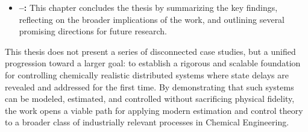 \begin{itemize}
    \item \textbf{--:} This chapter concludes the thesis by summarizing the key findings, reflecting on the broader implications of the work, and outlining several promising directions for future research.
\end{itemize}


This thesis does not present a series of disconnected case studies, but a unified progression toward a larger goal: to establish a rigorous and scalable foundation for controlling chemically realistic distributed systems where state delays are revealed and addressed for the first time. By demonstrating that such systems can be modeled, estimated, and controlled without sacrificing physical fidelity, the work opens a viable path for applying modern estimation and control theory to a broader class of industrially relevant processes in Chemical Engineering.